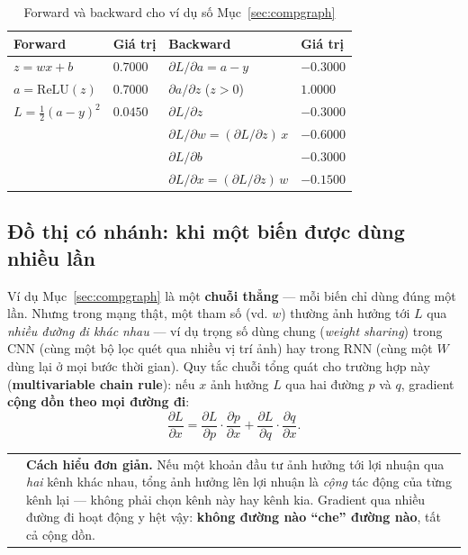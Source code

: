 \documentclass[12pt,a4paper]{report}
\makeatletter
\newenvironment{tructiep}[1][Cách hiểu đơn giản]
  {\par\smallskip\noindent\begin{tabular}{@{}p{0.35em}@{\hspace{6pt}}p{\dimexpr\linewidth-1.9em\relax}@{}}
   \textcolor{boxln}{\rule{2pt}{\baselineskip}} & \textbf{#1.}\enspace\ignorespaces}
  {\end{tabular}\par\smallskip}
\newcommand{\en}[1]{\textit{#1}}
\makeatother
\begin{document}
\begin{table}[htbp]
\centering
\caption{Forward và backward cho ví dụ số Mục~\ref{sec:compgraph}}
\begin{tabular}{@{}llll@{}}
\toprule
\textbf{Forward} & \textbf{Giá trị} & \textbf{Backward} & \textbf{Giá trị} \\
\midrule
$z=wx+b$ & $0.7000$ & $\partial L/\partial a = a-y$ & $-0.3000$ \\
$a=\mathrm{ReLU}(z)$ & $0.7000$ & $\partial a/\partial z$ ($z>0$) & $1.0000$ \\
$L=\tfrac12(a-y)^2$ & $0.0450$ & $\partial L/\partial z$ & $-0.3000$ \\
 & & $\partial L/\partial w = (\partial L/\partial z)\,x$ & $-0.6000$ \\
 & & $\partial L/\partial b$ & $-0.3000$ \\
 & & $\partial L/\partial x = (\partial L/\partial z)\,w$ & $-0.1500$ \\
\bottomrule
\end{tabular}
\label{tab:compgraph_numeric}
\end{table}

\subsection{Đồ thị có nhánh: khi một biến được dùng nhiều lần}
\label{sec:branching}

Ví dụ Mục~\ref{sec:compgraph} là một \textbf{chuỗi thẳng} --- mỗi biến chỉ
dùng đúng một lần. Nhưng trong mạng thật, một tham số (vd. $w$) thường ảnh
hưởng tới $L$ qua \emph{nhiều đường đi khác nhau} --- ví dụ trọng số dùng
chung (\en{weight sharing}) trong CNN (cùng một bộ lọc quét qua nhiều vị
trí ảnh) hay trong RNN (cùng một $W$ dùng lại ở mọi bước thời gian). Quy
tắc chuỗi tổng quát cho trường hợp này (\textbf{multivariable chain
rule}): nếu $x$ ảnh hưởng $L$ qua hai đường $p$ và $q$, gradient
\textbf{cộng dồn theo mọi đường đi}:
$$\frac{\partial L}{\partial x} = \frac{\partial L}{\partial p}\cdot\frac{\partial p}{\partial x} + \frac{\partial L}{\partial q}\cdot\frac{\partial q}{\partial x}.$$

\begin{tructiep}
Nếu một khoản đầu tư ảnh hưởng tới lợi nhuận qua \emph{hai} kênh khác
nhau, tổng ảnh hưởng lên lợi nhuận là \emph{cộng} tác động của từng kênh
lại --- không phải chọn kênh này hay kênh kia. Gradient qua nhiều đường đi
hoạt động y hệt vậy: \textbf{không đường nào ``che'' đường nào}, tất cả cộng
dồn.
\end{tructiep}
\end{document}

